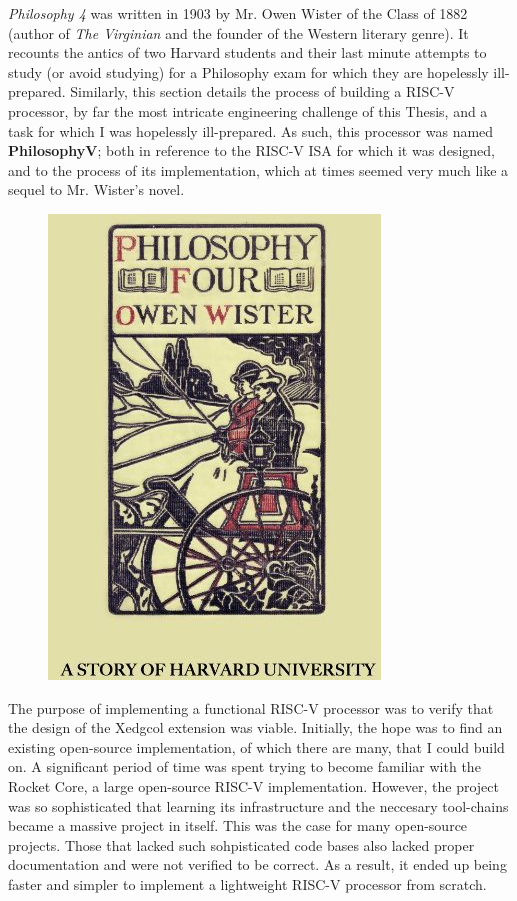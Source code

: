 
\textit{Philosophy 4} was written in 1903 by Mr. Owen Wister of the Class of 1882 (author of \textit{The Virginian} and the founder of the Western literary genre). It recounts the antics of two Harvard students and their last minute attempts to study (or avoid studying) for a Philosophy exam for which they are hopelessly ill-prepared. Similarly, this section details the process of building a RISC-V processor, by far the most intricate engineering challenge of this Thesis, and a task for which I was hopelessly ill-prepared. As such, this processor was named \textbf{PhilosophyV}; both in reference to the RISC-V ISA for which it was designed, and to the process of its implementation, which at times seemed very much like a sequel to Mr. Wister's novel. \\

\begin{figure}[H]
\begin{center}
\includegraphics[width=0.6\linewidth]{chapters/chapter4/img/phil4.jpg}
\end{center}
\end{figure}

The purpose of implementing a functional RISC-V processor was to verify that the design of the Xedgcol extension was viable. Initially, the hope was to find an existing open-source implementation, of which there are many, that I could build on. A significant period of time was spent trying to become familiar with the Rocket Core\cite{ChipsAlliance2020}, a large open-source RISC-V implementation. However, the project was so sophisticated that learning its infrastructure and the neccesary tool-chains became a massive project in itself. This was the case for many open-source projects. Those that lacked such sohpisticated code bases also lacked proper documentation and were not verified to be correct. As a result, it ended up being faster and simpler to implement a lightweight RISC-V processor from scratch. 

